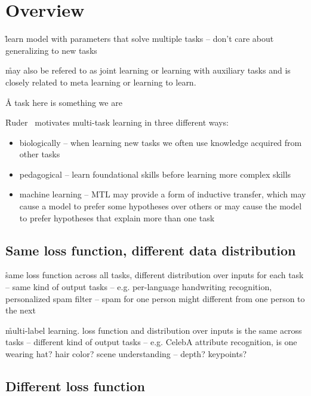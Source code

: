 \section{Overview}



\r{learn model with parameters that solve multiple tasks -- don't care about generalizing to new tasks}

\r{may also be refered to as joint learning or learning with auxiliary tasks and is closely related to meta learning  or learning to learn.}

\r{A task here is something we are }

\r{Ruder~\cite{DBLP:journals/corr/Ruder17a} motivates multi-task learning in three different ways:}

\begin{itemize}[noitemsep,topsep=0pt]
	\item biologically -- when learning new tasks we often use knowledge acquired from other tasks
	\item pedagogical -- learn foundational skills before learning more complex skills
	\item machine learning -- MTL may provide a form of inductive transfer, which may cause a model to prefer some hypotheses over others or may cause the model to prefer hypotheses that explain more than one task
\end{itemize}


\subsection{Same loss function, different data distribution}

\r{same loss function across all tasks, different distribution over inputs for each task -- same kind of output tasks -- e.g. per-language handwriting recognition, personalized spam filter -- spam for one person might different from one person to the next}

\r{multi-label learning. loss function and distribution over inputs is the same across tasks -- different kind of output tasks -- e.g. CelebA attribute recognition, is one wearing hat? hair color? scene understanding -- depth? keypoints?}

\subsection{Different loss function}

